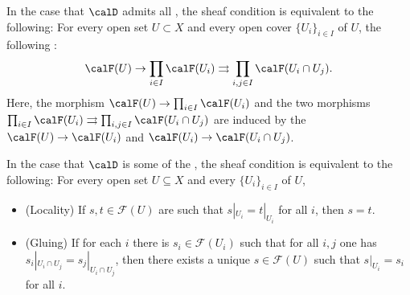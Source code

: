 \begin{definition}
    In the case that $\calD$ admits all , the sheaf condition is equivalent  to the following: For every open set $U \subset X$ and every open cover $\{U_i\}_{i \in I}$ of $U$, the following :
    $$\calF(U) \to \prod_{i \in I} \calF(U_i) \rightrightarrows \prod_{i,j \in I} \calF(U_i \cap U_j).$$
    Here, the morphism $\calF(U) \to \prod_{i \in I} \calF(U_i)$ and the two morphisms $\prod_{i \in I} \calF(U_i) \rightrightarrows \prod_{i,j \in I} \calF(U_i \cap U_j)$ are induced by the  $\calF(U) \to \calF(U_i)$ and $\calF(U_i) \to \calF(U_i \cap U_j)$.

    In the case that $\calD$ is some  of the , the sheaf condition is equivalent to the following: For every open set $U \subseteq X$ and every  $\{U_i\}_{i \in I}$ of $U$, 
    \begin{itemize}
        \item (Locality) If $s, t \in \mathcal{F}(U)$ are such that $s|_{U_i} = t|_{U_i}$ for all $i$, then $s = t$.
        \item (Gluing) If for each $i$ there is $s_i \in \mathcal{F}(U_i)$ such that for all $i,j$ one has $s_i|_{U_i \cap U_j} = s_j|_{U_i \cap U_j}$, then there exists a unique $s \in \mathcal{F}(U)$ such that $s|_{U_i} = s_i$ for all $i$.
    \end{itemize}


\end{definition}
